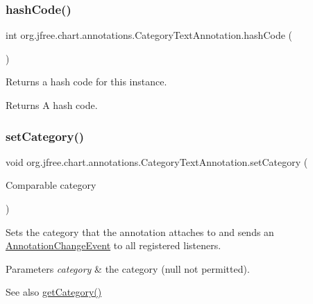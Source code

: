 \subsubsection{\texorpdfstring{hash\+Code()}{hashCode()}}
{\footnotesize\ttfamily int org.\+jfree.\+chart.\+annotations.\+Category\+Text\+Annotation.\+hash\+Code (\begin{DoxyParamCaption}{ }\end{DoxyParamCaption})}

Returns a hash code for this instance.

\begin{DoxyReturn}{Returns}
A hash code. 
\end{DoxyReturn}
\mbox{\label{classorg_1_1jfree_1_1chart_1_1annotations_1_1_category_text_annotation_a46532a1111e31b9639fc19920219d4ec}} 
\subsubsection{\texorpdfstring{set\+Category()}{setCategory()}}
{\footnotesize\ttfamily void org.\+jfree.\+chart.\+annotations.\+Category\+Text\+Annotation.\+set\+Category (\begin{DoxyParamCaption}\item[{Comparable}]{category }\end{DoxyParamCaption})}

Sets the category that the annotation attaches to and sends an \mbox{\hyperlink{}{Annotation\+Change\+Event}} to all registered listeners.


\begin{DoxyParams}{Parameters}
{\em category} & the category ({\ttfamily null} not permitted).\\
\hline
\end{DoxyParams}
\begin{DoxySeeAlso}{See also}
\mbox{\hyperlink{classorg_1_1jfree_1_1chart_1_1annotations_1_1_category_text_annotation_a8e8ceb3099ed1b881323510e6178b9a1}{get\+Category()}} 
\end{DoxySeeAlso}
\mbox{\label{classorg_1_1jfree_1_1chart_1_1annotations_1_1_category_text_annotation_afa9fb6f9815586605a76cb6f339a0c57}} 
